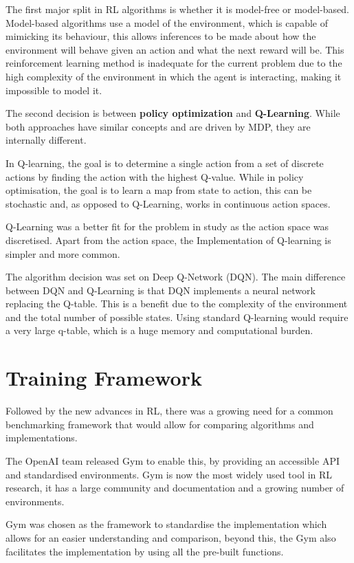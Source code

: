 The first major split in RL algorithms is whether it is model-free or model-based. Model-based algorithms use a model of the environment, which is capable of mimicking its behaviour, this allows inferences to be made about how the environment will behave given an action and what the next reward will be. This reinforcement learning method is inadequate for the current problem due to the high complexity of the environment in which the agent is interacting, making it impossible to model it.

The second decision is between \textbf{policy optimization} and \textbf{Q-Learning}. 
While both approaches have similar concepts and are driven by MDP, they are internally different. 

In Q-learning, the goal is to determine a single action from a set of discrete actions by finding the action with the highest Q-value. While in policy optimisation, the goal is to learn a map from state to action, this can be stochastic and, as opposed to Q-Learning, works in continuous action spaces.

Q-Learning was a better fit for the problem in study as the action space was discretised. Apart from the action space, the Implementation of Q-learning is simpler and more common.

The algorithm decision was set on Deep Q-Network (DQN). The main difference between DQN and Q-Learning is that DQN implements a neural network replacing the Q-table. This is a benefit due to the complexity of the environment and the total number of possible states. Using standard Q-learning would require a very large q-table, which is a huge memory and computational burden.

\section{Training Framework}
Followed by the new advances in RL, there was a growing need for a common benchmarking framework that would allow for comparing algorithms and implementations.

The OpenAI team released Gym to enable this, by providing an accessible API and standardised environments. Gym is now the most widely used tool in RL research, it has a large community and documentation and a growing number of environments\cite{gym}.

Gym was chosen as the framework to standardise the implementation which allows for an easier understanding and comparison, beyond this, the Gym also facilitates the implementation by using all the pre-built functions\cite{openai}.

